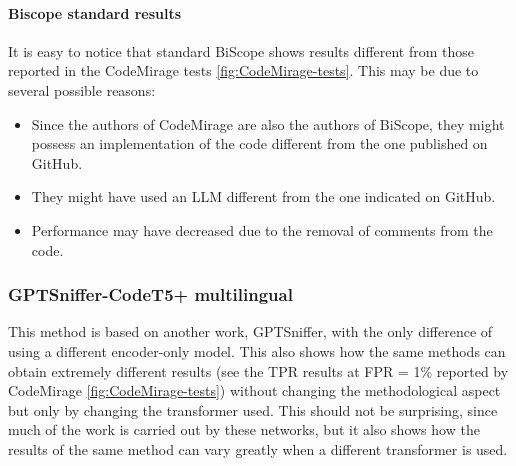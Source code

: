 \paragraph{Biscope standard results}
It is easy to notice that standard BiScope shows results different 
from those reported in the CodeMirage tests \ref{fig:CodeMirage-tests}. 
This may be due to several possible reasons:
\begin{itemize}
\item Since the authors of CodeMirage are also the authors of BiScope, 
they might possess an implementation of the code different from the one 
published on GitHub.
\item They might have used an LLM different from the one indicated on GitHub.
\item Performance may have decreased due to the removal of comments from the code.
\end{itemize}

\clearpage
\subsubsection{GPTSniffer-CodeT5+ multilingual}
This method is based on another work, GPTSniffer\cite{nguyen2024gptsniffer}, 
with the only difference 
of using a different encoder-only model. This also shows how the same methods 
can obtain extremely different results (see the TPR results at FPR = 1\% 
reported by CodeMirage \ref{fig:CodeMirage-tests}) 
without changing the methodological aspect but only by 
changing the transformer used. This should not be surprising, since much of the 
work is carried out by these networks, but it also shows how the results of the 
same method can vary greatly when a different transformer is used.

